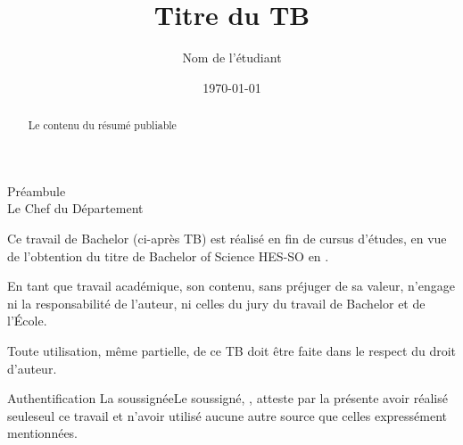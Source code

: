 \documentclass[a4paper,twoside,12pt,french]{heig-bachelor}
\title[short title]{Titre du TB}
\author[NÉ]{Nom de l'étudiant}
\date{\today}
\begin{document}
    \frontmatter
    \maketitle

    \begin{abstract}
        Le contenu du résumé publiable
    \end{abstract}

    \makeatletter %
    \begin{signedpage}{Préambule}{\@shortschool\\[0.5em] Le Chef du Département}{\@location}{\@date}

        Ce travail de Bachelor (ci-après TB) est réalisé en fin de cursus d’études, en vue de l’obtention du titre de Bachelor of Science HES-SO en \@bachelorof.

        En tant que travail académique, son contenu, sans préjuger de sa valeur, n'engage ni la responsabilité de l'auteur, ni celles du jury du travail de Bachelor et de l'École.

        Toute utilisation, même partielle, de ce TB doit être faite dans le respect du droit d’auteur.
    \end{signedpage}

    \begin{signedpage}{Authentification}{\@author}{\@location}{\@date}
        \if@authorgenderfem La soussignée\else Le soussigné\fi, \@author,
        atteste par la présente avoir réalisé
        \if@authorgenderfem seule\else seul\fi
        ce travail et n’avoir utilisé aucune autre source que celles expressément mentionnées.
    \end{signedpage}
    \makeatother

    \summary

    \mainmatter


    


    \backmatter

    \tableofcontents
    \listoffigures
    \listoftables
    \printbibliography
    \printindex
\end{document}
